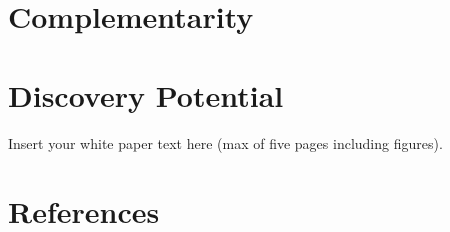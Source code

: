 \documentclass[12pt]{article}
\begin{document}
\section{Complementarity}

\section{Discovery Potential}



Insert your white paper text here (max of five pages including figures).

\pagebreak
\section{References}

\def\bibname{References}

\begingroup
  \small
  \setlength{\bibsep}{0pt plus 0.5ex}
  
  
\endgroup
\end{document}
